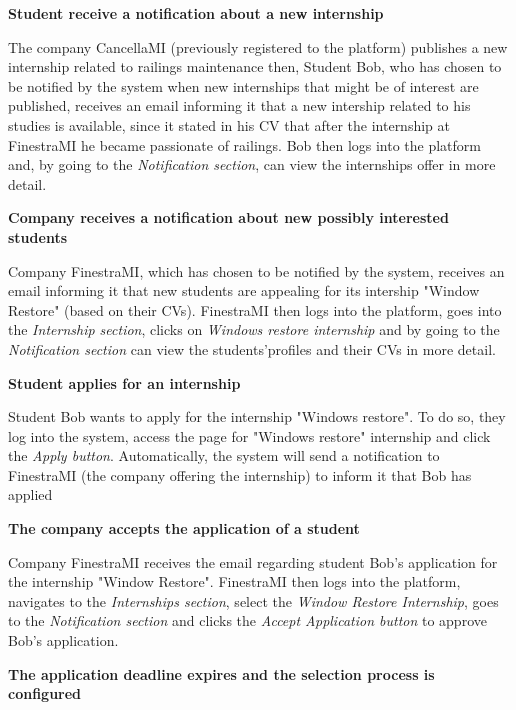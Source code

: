 		\textbf{Student receive a notification about a new internship}
		\begin{flushleft}
			The company CancellaMI (previously registered to the platform) publishes a new internship related to railings maintenance then, Student Bob, who has chosen to be notified by the system when new internships that might be of interest are published, receives an email informing it that a new intership related to his studies is available, since it stated in his CV that after the internship at FinestraMI he became passionate of railings. Bob then logs into the platform and, by going to the \emph{Notification section}, can view the internships offer in more detail.
		\end{flushleft}
		\textbf{Company receives a notification about new possibly interested students}
		\begin{flushleft}
			Company FinestraMI, which has chosen to be notified by the system, receives an email informing it that new students are appealing for its intership "Window Restore" (based on their CVs). FinestraMI then logs into the platform, goes into the \emph{Internship section}, clicks on \emph{Windows restore internship} and by going to the \emph{Notification section} can view the students'profiles and their CVs in more detail.
		\end{flushleft}
		\textbf{Student applies for an internship}
		\begin{flushleft}
			Student Bob wants to apply for the internship "Windows restore". To do so, they log into the system, access the page for "Windows restore" internship and click the \emph{Apply button}. Automatically, the system will send a notification to FinestraMI (the company offering the internship) to inform it that Bob has applied
		\end{flushleft}
		\textbf{The company accepts the application of a student}
		\begin{flushleft}
			Company FinestraMI receives the email regarding student Bob's application for the internship "Window Restore". FinestraMI then logs into the platform, navigates to the \emph{Internships section}, select the \emph{Window Restore Internship}, goes to the \emph{Notification section} and clicks the \emph{Accept Application button} to approve Bob's application.
		\end{flushleft}
		\textbf{The application deadline expires and the selection process is configured}
